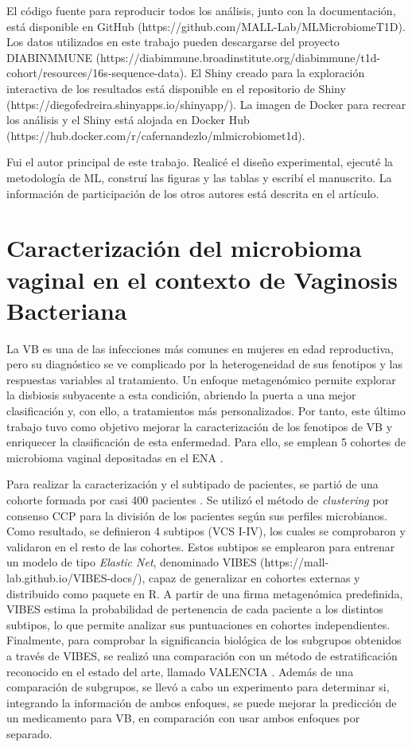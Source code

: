El código fuente para reproducir todos los análisis, junto con la documentación, está disponible en GitHub (https://github.com/MALL-Lab/MLMicrobiomeT1D). Los datos utilizados en este trabajo pueden descargarse del proyecto DIABINMMUNE (https://diabimmune.broadinstitute.org/diabimmune/t1d-cohort/resources/16s-sequence-data). El Shiny creado para la exploración interactiva de los resultados está disponible en el repositorio de Shiny (https://diegofedreira.shinyapps.io/shinyapp/). La imagen de Docker para recrear los análisis y el Shiny está alojada en Docker Hub (https://hub.docker.com/r/cafernandezlo/mlmicrobiomet1d).

Fui el autor principal de este trabajo. Realicé el diseño experimental, ejecuté la metodología de ML, construí las figuras y las tablas y escribí el manuscrito. La información de participación de los otros autores está descrita en el artículo.



\section{Caracterización del microbioma vaginal en el contexto de Vaginosis Bacteriana}

La VB es una de las infecciones más comunes en mujeres en edad reproductiva, pero su diagnóstico se ve complicado por la heterogeneidad de sus fenotipos y las respuestas variables al tratamiento. Un enfoque metagenómico permite explorar la disbiosis subyacente a esta condición, abriendo la puerta a una mejor clasificación y, con ello, a tratamientos más personalizados. Por tanto, este último trabajo tuvo como objetivo mejorar la caracterización de los fenotipos de VB y enriquecer la clasificación de esta enfermedad. Para ello, se emplean 5 cohortes de microbioma vaginal depositadas en el ENA \cite{leinonen2010european}.

Para realizar la caracterización y el subtipado de pacientes, se partió de una cohorte formada por casi 400 pacientes \cite{ravel2011vaginal}. Se utilizó el método de \textit{clustering} por consenso CCP \cite{wilkerson2010consensusclusterplus} para la división de los pacientes según sus perfiles microbianos. Como resultado, se definieron 4 subtipos (VCS I-IV), los cuales se comprobaron y validaron en el resto de las cohortes. Estos subtipos se emplearon para entrenar un modelo de tipo \textit{Elastic Net}, denominado VIBES (https://mall-lab.github.io/VIBES-docs/), capaz de generalizar en cohortes externas y distribuido como paquete en R. A partir de una firma metagenómica predefinida, VIBES estima la probabilidad de pertenencia de cada paciente a los distintos subtipos, lo que permite analizar sus puntuaciones en cohortes independientes. Finalmente, para comprobar la significancia biológica de los subgrupos obtenidos a través de VIBES, se realizó una comparación con un método de estratificación reconocido en el estado del arte, llamado VALENCIA \cite{france2020valencia}. Además de una comparación de subgrupos, se llevó a cabo un experimento para determinar si, integrando la información de ambos enfoques, se puede mejorar la predicción de un medicamento para VB, en comparación con usar ambos enfoques por separado.

